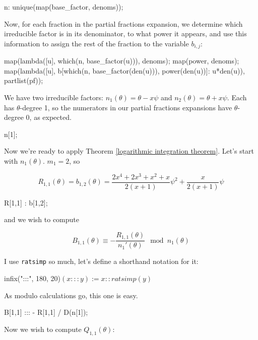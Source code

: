 \begin{maximacode}
n: unique(map(base_factor, denoms));
\end{maximacode}

Now, for each fraction in the partial fractions
expansion, we determine which irreducible
factor is in its denominator, to what power
it appears, and use this information to
assign the rest of the fraction to the
variable $b_{i,j}$:

\begin{maximacode}
map(lambda([u], which(n, base_factor(u))), denoms);
map(power, denoms);
map(lambda([u],
       b[which(n, base_factor(den(u))),
         power(den(u))]: u*den(u)),
    partlist(pf));
\end{maximacode}


We have two irreducible factors: $n_1(\theta) = \theta - x \psi$ and
$n_2(\theta) = \theta + x \psi$.  Each has $\theta$-degree 1, so
the numerators in our partial fractions expansions have
$\theta$-degree 0, as expected.

\begin{maximacode}
n[1];
\end{maximacode}

Now we're ready to apply
Theorem \ref{logarithmic integration theorem}.  Let's start with
$n_1(\theta)$.  $m_1=2$, so

$$R_{1,1}(\theta) = b_{1,2}(\theta) = \frac{2x^4+2x^3+x^2+x}{2(x+1)}\psi^2 + \frac{x}{2(x+1)} \psi$$

\begin{maximacode}
R[1,1] : b[1,2];
\end{maximacode}

and we wish to compute

$$ B_{1,1}(\theta) \equiv - \frac{R_{1,1}(\theta)}{n_1'(\theta) } \mod n_1(\theta)$$

I use {\tt ratsimp} so much, let's define a shorthand notation for it:

\begin{maximacode}
infix(":::", 180, 20)$
(x ::: y) := x :: ratsimp(y)$
\end{maximacode}

As modulo calculations go, this one is easy.

\begin{maximacode}
B[1,1] ::: - R[1,1] / D(n[1]);
\end{maximacode}

Now we wish to compute $Q_{1,1}(\theta)$:

